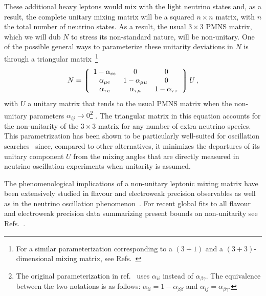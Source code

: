 These additional heavy leptons would mix with the light neutrino
states and, as a result, the complete unitary mixing matrix will be a
squared $n \times n$ matrix, with $n$ the total number of neutrino
states. As a result, the usual $3\times 3$ PMNS matrix, which we will dub $N$ to stress its non-standard nature, will be
non-unitary. One of the possible general ways to parameterize these unitarity deviations in $N$ is through a triangular matrix~\cite{Escrihuela:2015wra}\footnote{For a similar parameterization corresponding to a $(3+1)$ and a $(3+3)$-dimensional mixing matrix,  see Refs.~\cite{Xing:2007zj,Xing:2011ur}}
 \begin{equation}
  N = 
 \left\lgroup
 \begin{array}{ccc} 
 1-\alpha_{ee} & 0 & 0 \\
 \alpha_{\mu e} & 1-\alpha_{\mu \mu} & 0 \\
  \alpha_{\tau e} & \alpha_{\tau \mu} & 1-\alpha_{\tau \tau}
 \end{array}
 \right \rgroup U \,,
 \label{eq:triangular}
 \end{equation}
with $U$ a unitary matrix that tends to the usual PMNS matrix when the non-unitary parameters $\alpha_{ij} \rightarrow 0$\footnote{The original parameterization in ref.~\cite{Escrihuela:2015wra} uses $\alpha_{ii}$ instead of $\alpha_{\beta\gamma}$. The equivalence between the two notations is as follows: $\alpha_{ii} = 1-\alpha_{\beta\beta}$ and $\alpha_{ij} = \alpha_{\beta\gamma}$.} .
%
 The triangular
matrix in this equation accounts for the non-unitarity of the $3\times 3$ matrix for any number of extra neutrino species. This parametrization has been shown to be particularly well-suited for oscillation searches~\cite{Escrihuela:2015wra,Blennow:2016jkn} since, compared to other alternatives, it minimizes the departures of its unitary component $U$ from the mixing angles that are directly measured in neutrino oscillation experiments when unitarity is assumed.

The phenomenological implications of a non-unitary leptonic mixing matrix have been extensively studied in flavour and electroweak precision observables as well as in the neutrino oscillation phenomenon~\cite{Shrock:1980vy,Schechter:1980gr,Shrock:1980ct,Shrock:1981wq,Langacker:1988ur,Bilenky:1992wv,Nardi:1994iv,Tommasini:1995ii,Antusch:2006vwa,FernandezMartinez:2007ms,Antusch:2008tz,Biggio:2008in,Antusch:2009pm,Forero:2011pc,Alonso:2012ji,Antusch:2014woa,Abada:2015trh,Fernandez-Martinez:2015hxa,Escrihuela:2015wra,Parke:2015goa,Miranda:2016wdr,Fong:2016yyh,Escrihuela:2016ube}. For recent global fits to all flavour and electroweak precision data summarizing present bounds on non-unitarity see Refs.~\cite{Antusch:2014woa,Fernandez-Martinez:2016lgt}. 

